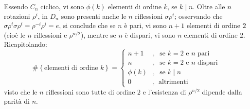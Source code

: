 \documentclass[12pt]{scrartcl}
\theoremstyle{style}
\numberwithin{equation}{subsection}
\begin{document}
Essendo $C_n$ ciclico, vi sono $\phi (k)$ elementi di ordine $k$, se $k  \mid  n$.
Oltre alle $n$ rotazioni $\rho ^i$, in $D_n$ sono presenti anche le $n$ riflessioni $\sigma \rho ^i$; osservando che $\sigma \rho ^i \sigma \rho ^i = \rho ^{-i}\rho ^{i} = e $, si conclude che se $n$ \`e pari, vi sono $n+1$ elementi di ordine $2$ (cio\`e le $n$ riflessioni e $\rho ^{n / 2} $), mentre se $n$ \`e dispari, vi sono $n$ elementi di ordine $2$.
Ricapitolando:
\begin{equation}
\# \left\{ \text{elementi di ordine } k \right\} = \begin{cases}
	n + 1 &,\ \text{ se } k=2 \text{ e } n \text{ pari}\\
	n  &,\  \text{ se }k=2 \text{ e } n \text{ dispari}\\
	\phi (k)&,\ \text{ se } k \mid n\\
	0 &,\ \text{ altrimenti }
\end{cases}
\end{equation}
visto che le $n$ riflessioni sono tutte di ordine $2$ e l'esistenza di $\rho ^{n / 2} $ dipende dalla parit\`a di $n$.
\vspace*{5pt}
\end{document}
